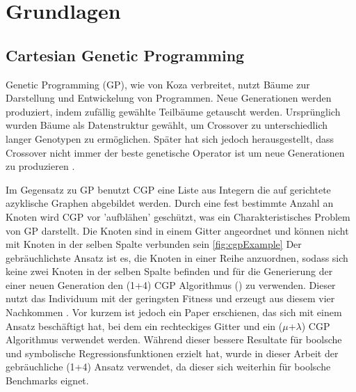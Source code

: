 


\newtheorem{myclaim}[claims]{Scientific Claim}
\newtheorem{hypothesis}[hypothesises]{Hypothesis}

\chapter{Grundlagen}
\label{cha:grundlagen}

\section{Cartesian Genetic Programming}



\opensymdef
{}
\closesymdef


Genetic Programming (GP), wie von Koza 
\cite{koza-90}\cite{koza:book}\cite{koza:gp2} 
verbreitet, nutzt Bäume zur Darstellung und Entwickelung von Programmen. Neue Generationen werden produziert, indem zufällig gewählte Teilbäume getauscht werden. Ursprünglich wurden Bäume als Datenstruktur gewählt, um Crossover zu unterschiedlich langer Genotypen zu ermöglichen. Später hat sich jedoch herausgestellt, dass Crossover nicht immer der beste genetische Operator ist um neue Generationen zu produzieren
\cite{luke:1997:ccmGP}\cite{luke:1998:rcxmGP}\cite{oai:generic.eprints.org:55371}.

Im Gegensatz zu GP benutzt CGP eine Liste aus Integern die auf gerichtete azyklische Graphen abgebildet werden. Durch eine fest bestimmte Anzahl an Knoten wird CGP vor 'aufblähen' geschützt, was ein Charakteristisches Problem von GP darstellt. Die Knoten sind in einem Gitter angeordnet und können nicht mit Knoten in der selben Spalte verbunden sein \ref{fig:cgpExample} Der gebräuchlichste Ansatz ist es, die Knoten in einer Reihe anzuordnen, sodass sich keine zwei Knoten in der selben Spalte befinden und für die Generierung der einer neuen Generation den (1+4) CGP Algorithmus () zu verwenden. Dieser nutzt das Individuum mit der geringsten Fitness und erzeugt aus diesem vier Nachkommen 
\cite{miller:2000:CGP}. 
Vor kurzem ist jedoch ein Paper erschienen, das sich mit einem Ansatz beschäftigt hat, bei dem ein rechteckiges Gitter und ein ($\mu$+$\lambda$) CGP Algorithmus verwendet werden\cite{conf/ki/KaufmannK17}. Während dieser bessere Resultate für boolsche und symbolische Regressionsfunktionen erzielt hat, wurde in dieser Arbeit der gebräuchliche (1+4) Ansatz verwendet, da dieser sich weiterhin für boolsche Benchmarks eignet.

